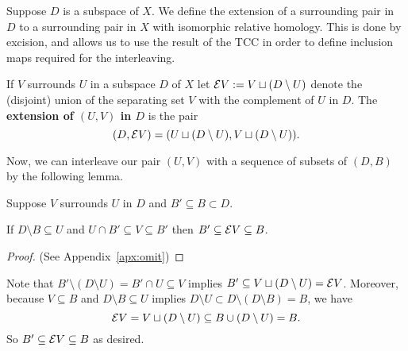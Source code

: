 

Suppose $D$ is a subspace of $X$.
We define the extension of a surrounding pair in $D$ to a surrounding pair in $X$ with isomorphic relative homology.
This is done by excision, and allows us to use the result of the TCC in order to define inclusion maps required for the interleaving.

\begin{definition}[Extension]
  If $V$ surrounds $U$ in a subspace $D$ of $X$ let $\mathcal{E} V := V\sqcup (D\setminus U)$ denote the (disjoint) union of the separating set $V$ with the complement of $U$ in $D$.
  The \textbf{extension of $(U, V)$ in $D$} is the pair
  \[ (D, \mathcal{E} V) = (U\sqcup (D\setminus U), V\sqcup (D\setminus U)).\]
\end{definition}

Now, we can interleave our pair $(U, V)$ with a sequence of subsets of $(D, B)$ by the following lemma.

\begin{lemma}\label{lem:surround_and_cover}
  Suppose $V$ surrounds $U$ in $D$ and $B'\subseteq B\subset D$.

  If $D\setminus B\subseteq U$ and $U\cap B'\subseteq V\subseteq B'$ then $B'\subseteq \mathcal{E} V\subseteq B$.
\end{lemma}
\begin{proof}
  (See Appendix~\ref{apx:omit})
\end{proof}
\proofatend
  Note that $B'\setminus (D\setminus U) = B'\cap U\subseteq V$ implies $B'\subseteq V\sqcup(D\setminus U) = \mathcal{E} V$.
  Moreover, because $V\subseteq B$ and $D\setminus B\subseteq U$ implies $D\setminus U \subset D\setminus (D\setminus B) = B$, we have
  \[ \mathcal{E} V = V\sqcup (D\setminus U) \subseteq B\cup (D\setminus U) = B. \]
  So $B' \subseteq \mathcal{E} V\subseteq B$ as desired.
\endproofatend

